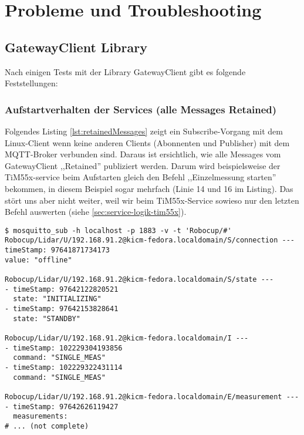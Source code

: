 \chapter{Probleme und Troubleshooting}
\section{GatewayClient Library}

Nach einigen Tests mit der Library GatewayClient gibt es folgende Feststellungen:
\subsection{Aufstartverhalten der Services (alle Messages Retained)}
Folgendes Listing \ref{lst:retainedMessages} zeigt ein Subscribe-Vorgang mit dem Linux-Client  wenn keine anderen Clients (Abonnenten und Publisher) mit dem MQTT-Broker verbunden sind. Daraus ist ersichtlich, wie alle Messages vom GatewayClient ,,Retained'' publiziert werden. Darum wird beispielsweise der TiM55x-service beim Aufstarten gleich den Befehl ,,Einzelmessung starten'' bekommen, in diesem Beispiel sogar mehrfach (Linie 14 und 16 im Listing). Das stört uns aber nicht weiter, weil wir beim TiM55x-Service sowieso nur den letzten Befehl auswerten (siehe \ref{sec:service-logik-tim55x}).
\begin{lstlisting}[caption={Subscribe mit mosquitto\_sub, Aufstartverhalten},label={lst:retainedMessages}]
$ mosquitto_sub -h localhost -p 1883 -v -t 'Robocup/#' 
Robocup/Lidar/U/192.168.91.2@kicm-fedora.localdomain/S/connection ---
timeStamp: 97641871734173
value: "offline"

Robocup/Lidar/U/192.168.91.2@kicm-fedora.localdomain/S/state ---
- timeStamp: 97642122820521
  state: "INITIALIZING"
- timeStamp: 97642153828641
  state: "STANDBY"

Robocup/Lidar/U/192.168.91.2@kicm-fedora.localdomain/I ---
- timeStamp: 102229304193856
  command: "SINGLE_MEAS"
- timeStamp: 102229322431114       
  command: "SINGLE_MEAS"

Robocup/Lidar/U/192.168.91.2@kicm-fedora.localdomain/E/measurement ---
- timeStamp: 97642626119427
  measurements:
# ... (not complete)

\end{lstlisting}
